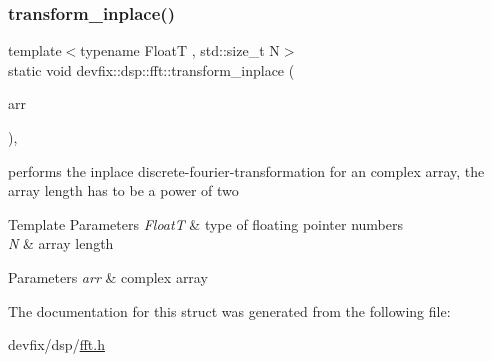 \subsubsection{\texorpdfstring{transform\+\_\+inplace()}{transform\_inplace()}\hspace{0.1cm}{\footnotesize\ttfamily [3/3]}}
{\footnotesize\ttfamily template$<$typename FloatT , std\+::size\+\_\+t N$>$ \\
static void devfix\+::dsp\+::fft\+::transform\+\_\+inplace (\begin{DoxyParamCaption}\item[{std\+::array$<$ std\+::complex$<$ FloatT $>$, N $>$ \&}]{arr }\end{DoxyParamCaption})\hspace{0.3cm}{\ttfamily [inline]}, {\ttfamily [static]}}



performs the inplace discrete-\/fourier-\/transformation for an complex array, the array length has to be a power of two 


\begin{DoxyTemplParams}{Template Parameters}
{\em FloatT} & type of floating pointer numbers \\
\hline
{\em N} & array length \\
\hline
\end{DoxyTemplParams}

\begin{DoxyParams}{Parameters}
{\em arr} & complex array \\
\hline
\end{DoxyParams}


The documentation for this struct was generated from the following file\+:\begin{DoxyCompactItemize}
\item 
devfix/dsp/\hyperlink{fft_8h}{fft.\+h}\end{DoxyCompactItemize}
